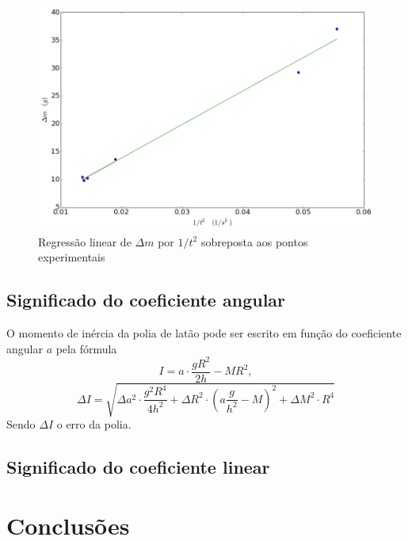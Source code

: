 \documentclass[12pt,a4paper]{article}
\begin{document}
\begin{figure}
\includegraphics[scale=0.55]{grafico.png}
\caption{Regressão linear de $\Delta m$ por $1/t^2$ sobreposta aos pontos experimentais}
\label{grafico}
\end{figure}

\subsection{Significado do coeficiente angular}
O momento de inércia da polia de latão pode ser escrito em função do coeficiente angular $a$ pela fórmula 
$$I = a\cdot\frac{gR^2}{2h}-MR^2,$$
$$\Delta I = \sqrt{\Delta a^2 \cdot \frac{g^2R^4}{4h^2} + \Delta R^2 \cdot (a\frac{g}{h^2} - M)^2 + \Delta M^2\cdot R^4}$$
Sendo $\Delta I$ o erro da polia.


\subsection{Significado do coeficiente linear}

\section{Conclusões}
\end{document}

